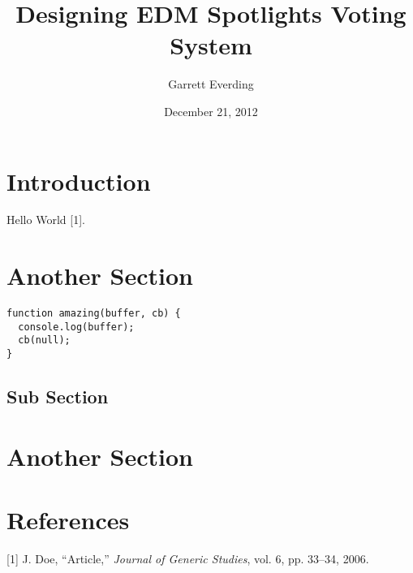 \documentclass[12pt,]{article}
\title{Designing EDM Spotlights Voting System}
\author{Garrett Everding}
\date{December 21, 2012}
\begin{document}
\maketitle
\thispagestyle{empty}
\pagebreak

\setcounter{page}{1}

{
\hypersetup{linkcolor=black}
\tableofcontents
\pagebreak

\listoffigures
\pagebreak
}

\setcounter{page}{1}
\section{Introduction}

Hello World {[}1{]}.

\section{Another Section}

\begin{lstlisting}
function amazing(buffer, cb) {
  console.log(buffer);
  cb(null);
}
\end{lstlisting}

\subsection{Sub Section}

\section{Another Section}

\pagebreak

\section{References}

{[}1{]} J. Doe, ``Article,'' \emph{Journal of Generic Studies}, vol. 6,
pp. 33--34, 2006.
\end{document}
